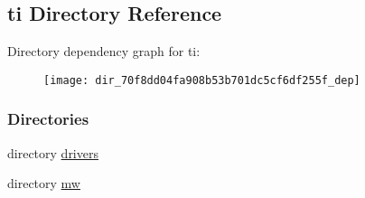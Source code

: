 \subsection{ti Directory Reference}
\label{dir_70f8dd04fa908b53b701dc5cf6df255f}
Directory dependency graph for ti\+:
\nopagebreak
\begin{figure}[H]
\begin{center}
\leavevmode
\texttt{[image: dir\_70f8dd04fa908b53b701dc5cf6df255f\_dep]}
\end{center}
\end{figure}
\subsubsection*{Directories}
\begin{DoxyCompactItemize}
\item 
directory \hyperlink{dir_9ed54c436094c10285761171525ba0a5}{drivers}
\item 
directory \hyperlink{dir_d3aa2816958b67bf97847e60ab6f41f5}{mw}
\end{DoxyCompactItemize}

